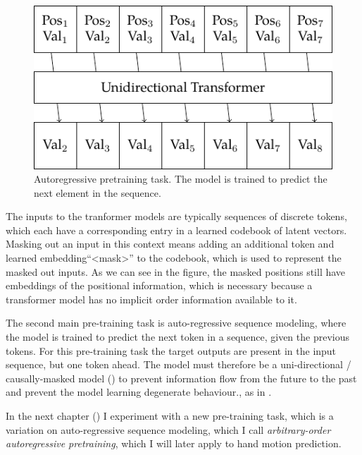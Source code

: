 \begin{figure}
    \centering
    \includegraphics[width=\linewidth]{figures/pretraining-causal.pdf}
    \caption[Autoregressive Sequence Modeling Pretraining]{Autoregressive pretraining task. The model is trained to predict the next element in the sequence.}
    \label{fig:pretraining-causal}
\end{figure}

The inputs to the tranformer models are typically sequences of discrete tokens, which each have a corresponding entry in a learned codebook of latent vectors. Masking out an input in this context means adding an additional token and learned embedding``<mask>'' to the codebook, which is used to represent the masked out inputs. As we can see in the figure, the masked positions still have embeddings of the positional information, which is necessary because a transformer model has no implicit order information available to it.

The second main pre-training task is auto-regressive sequence modeling, where the model is trained to predict the next token in a sequence, given the previous tokens. For this pre-training task the target outputs are present in the input sequence, but one token ahead. The model must therefore be a uni-directional / causally-masked model () to prevent information flow from the future to the past and prevent the model learning degenerate behaviour., as in .




In the next chapter () I experiment with a new pre-training task, which is a variation on auto-regressive sequence modeling, which I call \textit{arbitrary-order autoregressive pretraining}, which I will later apply to hand motion prediction.
